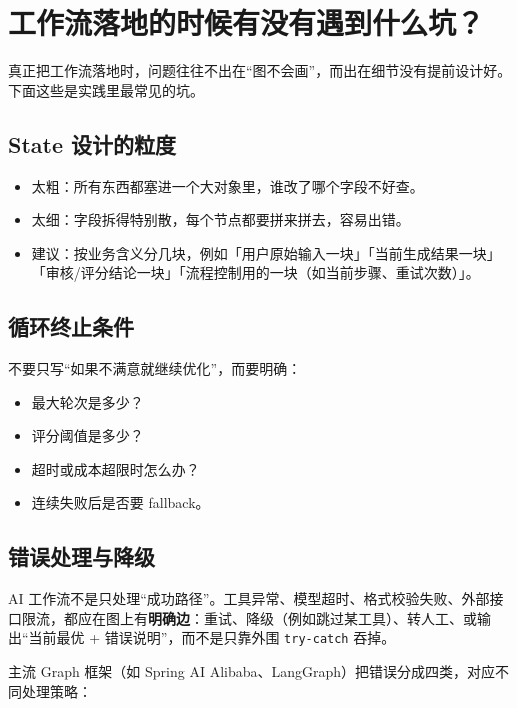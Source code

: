 \documentclass[9pt,a4paper,twocolumn]{ctexart}
\begin{document}
\section*{工作流落地的时候有没有遇到什么坑？}


真正把工作流落地时，问题往往不出在“图不会画”，而出在细节没有提前设计好。下面这些是实践里最常见的坑。



\subsection*{State 设计的粒度}

\begin{itemize}[itemsep=1pt, topsep=2pt]
  \item 太粗：所有东西都塞进一个大对象里，谁改了哪个字段不好查。
  \item 太细：字段拆得特别散，每个节点都要拼来拼去，容易出错。
  \item 建议：按业务含义分几块，例如「用户原始输入一块」「当前生成结果一块」「审核/评分结论一块」「流程控制用的一块（如当前步骤、重试次数）」。
\end{itemize}


\subsection*{循环终止条件}


不要只写“如果不满意就继续优化”，而要明确：


\begin{itemize}[itemsep=1pt, topsep=2pt]
  \item 最大轮次是多少？
  \item 评分阈值是多少？
  \item 超时或成本超限时怎么办？
  \item 连续失败后是否要 fallback。
\end{itemize}


\subsection*{错误处理与降级}


AI 工作流不是只处理“成功路径”。工具异常、模型超时、格式校验失败、外部接口限流，都应在图上有\textbf{明确边}：重试、降级（例如跳过某工具）、转人工、或输出“当前最优 + 错误说明”，而不是只靠外围 \texttt{try-catch} 吞掉。



主流 Graph 框架（如 Spring AI Alibaba、LangGraph）把错误分成四类，对应不同处理策略：
\end{document}
